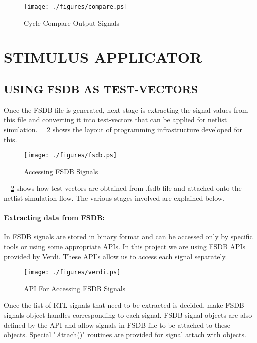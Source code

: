 \begin{figure}[h]
\centering
\texttt{[image: ./figures/compare.ps]}
\caption{Cycle Compare Output Signals}
\label{fig:compare.ps}
\end{figure}


\section{STIMULUS APPLICATOR}
\label{sec:dualsim:sa}

\subsection{USING FSDB AS TEST-VECTORS}
Once the FSDB file is generated, next stage is extracting the signal values from this file and converting it into test-vectors that can be applied for netlist simulation.  ~\figurename{~\ref{fig:fsdb.ps}} shows the layout of programming infrastructure developed for this.

\begin{figure}[h]
\centering
\texttt{[image: ./figures/fsdb.ps]}
\caption{Accessing FSDB Signals}
\label{fig:fsdb.ps}
\end{figure}

~\figurename{~\ref{fig:fsdb.ps}} shows how test-vectors are obtained from .fsdb file and attached onto the netlist simulation flow. The various stages involved are explained below.

\paragraph{Extracting data from FSDB:}In FSDB signals are stored in binary format and can be accessed only by specific tools or using some appropriate APIs.  In this project we are using FSDB APIs provided by Verdi. These API's allow us to access each signal separately. 


\begin{figure}[h]
\centering
\texttt{[image: ./figures/verdi.ps]}
\caption{API For Accessing FSDB Signals}
\label{fig:verdi.eps}
\end{figure}

Once the list of RTL signals that need to be extracted is decided, make FSDB signals object handles corresponding to each signal. FSDB signal objects are also defined by the API and allow signals in FSDB file to be attached to these objects. Special "{\emph Attach()}" routines are provided for signal attach with objects.

